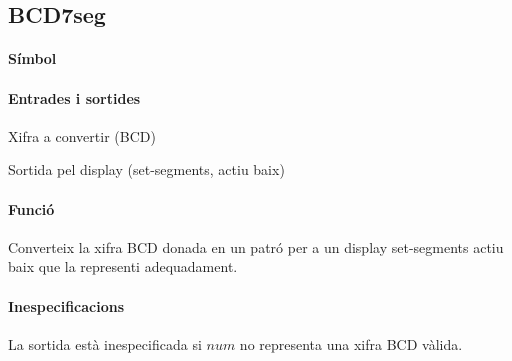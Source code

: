 \subsection{\label{sub:\projectname-BCD7seg} \textsf{BCD7seg}}

\paragraph{Símbol}

\begin{center}  \end{center}

\paragraph{Entrades i sortides}

\begin{where}
\item[\nodenamerange{num}{3}{0}] Xifra a convertir (BCD)
\item[\nodenamerange{HEX}{6}{0}] Sortida pel display (set-segments, actiu baix)
\end{where}

\paragraph{Funció}

Converteix la xifra BCD donada en un patró per a un display set-segments actiu baix
que la representi adequadament.

\paragraph{Inespecificacions}


La sortida està inespecificada si $num$ no representa una xifra BCD vàlida.


\vspace{1cm}
